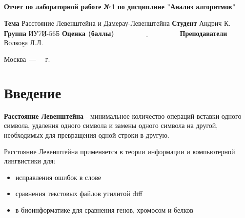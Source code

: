 \documentclass[12pt]{report}
\begin{document}
\begin{titlepage}
	
	\begin{center}
		\noindent\begin{minipage}{1.3\textwidth}\centering
			\Large\textbf{  Отчет по лабораторной работе №1}\newline
			\textbf{по дисциплине "Анализ алгоритмов"}\newline\newline
		\end{minipage}
	\end{center}
	
	\noindent\textbf{Тема} $\underline{\text{Расстояние Левенштейна и Дамерау-Левенштейна}}$\newline\newline
	\noindent\textbf{Студент} $\underline{\text{Андрич К. }}$\newline\newline
	\noindent\textbf{Группа} $\underline{\text{ИУ7И-56Б}}$\newline\newline
	\noindent\textbf{Оценка (баллы)} $\underline{\text{~~~~~~~~~~~~~~~~~~~~~~~~~~~}}$\newline\newline
	\noindent\textbf{Преподаватели} $\underline{\text{Волкова Л.Л.}}$\newline\newline\newline
	
	\begin{center}
		\vfill
		Москва~---~\the\year
		~г.
	\end{center}
\end{titlepage}


\tableofcontents

\newpage
\chapter*{Введение}
\textbf{Расстояние Левенштейна} - минимальное количество операций вставки одного символа, удаления одного символа и замены одного символа на другой, необходимых для превращения одной строки в другую.
\newline

Расстояние Левенштейна применяется в теории информации и компьютерной лингвистики для:

\begin{itemize}
	\item исправления ошибок в слове
	\item сравнения текстовых файлов утилитой diff
	\item в биоинформатике для сравнения генов, хромосом и белков
\end{itemize}
\end{document}
